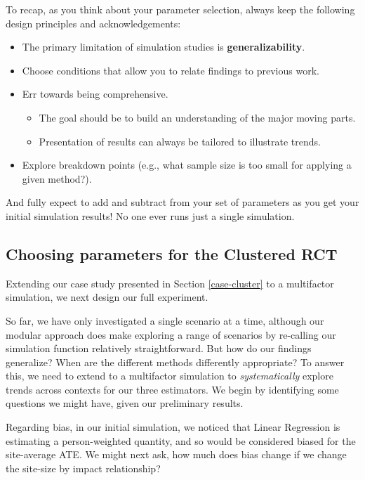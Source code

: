 \documentclass[
]{book}
\providecommand{\tightlist}{%
  \setlength{\itemsep}{0pt}\setlength{\parskip}{0pt}}
\begin{document}
To recap, as you think about your parameter selection, always keep the following design principles and acknowledgements:

\begin{itemize}
\tightlist
\item
  The primary limitation of simulation studies is \textbf{generalizability}.
\item
  Choose conditions that allow you to relate findings to previous work.
\item
  Err towards being comprehensive.

  \begin{itemize}
  \tightlist
  \item
    The goal should be to build an understanding of the major moving parts.
  \item
    Presentation of results can always be tailored to illustrate trends.
  \end{itemize}
\item
  Explore breakdown points (e.g., what sample size is too small for applying a given method?).
\end{itemize}

And fully expect to add and subtract from your set of parameters as you get your initial simulation results! No one ever runs just a single simulation.

\subsection{Choosing parameters for the Clustered RCT}\label{choosing-parameters-for-the-clustered-rct}

Extending our case study presented in Section \ref{case-cluster} to a multifactor simulation, we next design our full experiment.

So far, we have only investigated a single scenario at a time, although our modular approach does make exploring a range of scenarios by re-calling our simulation function relatively straightforward.
But how do our findings generalize? When are the different methods differently appropriate?
To answer this, we need to extend to a multifactor simulation to \emph{systematically} explore trends across contexts for our three estimators.
We begin by identifying some questions we might have, given our preliminary results.

Regarding bias, in our initial simulation, we noticed that Linear Regression is estimating a person-weighted quantity, and so would be considered biased for the site-average ATE.
We might next ask, how much does bias change if we change the site-size by impact relationship?
\end{document}
